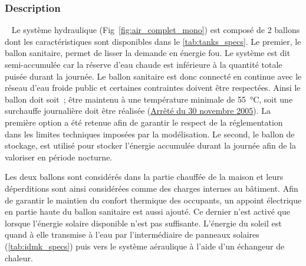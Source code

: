 \subsubsection{Description} %
\label{ssub:description_hydraulique}
~
Le système hydraulique (Fig~\ref{fig:air_complet_mono}) est composé de 2 ballons dont les
caractéristiques sont disponibles dans le \autoref{tab:tanks_specs}. Le
premier, le ballon sanitaire, permet de lisser la demande en énergie fou. Le système est
dit semi-accumulée car la réserve d’eau chaude est inférieure à la quantité totale puisée
durant la journée. Le ballon sanitaire est donc connecté en continue avec le réseau d’eau
froide public et certaines contraintes doivent être respectées. Ainsi le ballon doit soit~;
être maintenu à une température minimale de \SI{55}{\celsius}, soit une surchauffe
journalière doit être réalisée
(\href{https://www.legifrance.gouv.fr/affichTexte.do?cidTexte=JORFTEXT000000423756}{Arrêté
du 30 novembre 2005}). La première option a été retenue afin de garantir le respect de la
réglementation dans les limites techniques imposées par la modélisation. Le second, le
ballon de stockage, est utilisé pour stocker l’énergie accumulée durant la journée afin de
la valoriser en période nocturne.

Les deux ballons sont considérés dans la partie chauffée de la maison et leurs
déperditions sont ainsi considérées comme des charges internes au bâtiment. Afin de
garantir le maintien du confort thermique des occupants, un appoint électrique en partie
haute du ballon sanitaire est aussi ajouté. Ce dernier n’est activé que lorsque l’énergie
solaire disponible n’est pas suffisante. L’énergie du soleil est quand à elle transmise à
l’eau par l’intermédiaire de panneaux solaires (\autoref{tab:idmk_specs}) puis vers le
système aéraulique à l’aide d’un échangeur de chaleur.

